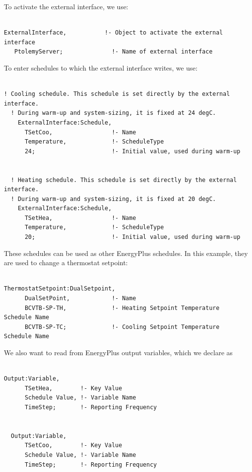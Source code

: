 To activate the external interface, we use:

\begin{lstlisting}

ExternalInterface,           !- Object to activate the external interface
   PtolemyServer;              !- Name of external interface
\end{lstlisting}

To enter schedules to which the external interface writes, we use:

\begin{lstlisting}

! Cooling schedule. This schedule is set directly by the external interface.
  ! During warm-up and system-sizing, it is fixed at 24 degC.
    ExternalInterface:Schedule,
      TSetCoo,                 !- Name
      Temperature,             !- ScheduleType
      24;                      !- Initial value, used during warm-up


  ! Heating schedule. This schedule is set directly by the external interface.
  ! During warm-up and system-sizing, it is fixed at 20 degC.
    ExternalInterface:Schedule,
      TSetHea,                 !- Name
      Temperature,             !- ScheduleType
      20;                      !- Initial value, used during warm-up
\end{lstlisting}

These schedules can be used as other EnergyPlus schedules. In this example, they are used to change a thermostat setpoint:

\begin{lstlisting}

ThermostatSetpoint:DualSetpoint,
      DualSetPoint,            !- Name
      BCVTB-SP-TH,             !- Heating Setpoint Temperature Schedule Name
      BCVTB-SP-TC;             !- Cooling Setpoint Temperature Schedule Name
\end{lstlisting}

We also want to read from EnergyPlus output variables, which we declare as

\begin{lstlisting}

Output:Variable,
      TSetHea,        !- Key Value
      Schedule Value, !- Variable Name
      TimeStep;       !- Reporting Frequency


  Output:Variable,
      TSetCoo,        !- Key Value
      Schedule Value, !- Variable Name
      TimeStep;       !- Reporting Frequency
\end{lstlisting}


